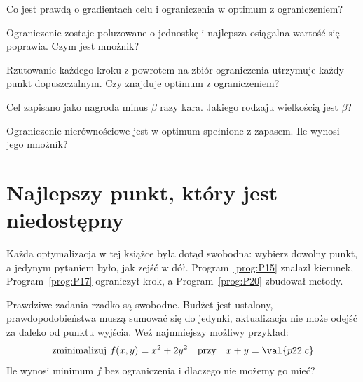 \begin{quiz}
\item Co jest prawdą o gradientach celu i ograniczenia w optimum z
  ograniczeniem? 
\item Ograniczenie zostaje poluzowane o jednostkę i najlepsza osiągalna
  wartość się poprawia. Czym jest mnożnik? 
\item Rzutowanie każdego kroku z powrotem na zbiór ograniczenia utrzymuje
  każdy punkt dopuszczalnym. Czy znajduje optimum z ograniczeniem?
\item Cel zapisano jako nagroda minus $\beta$ razy kara. Jakiego rodzaju
  wielkością jest $\beta$? 
\item Ograniczenie nierównościowe jest w optimum spełnione z zapasem. Ile
  wynosi jego mnożnik? 
\end{quiz}

\section{Najlepszy punkt, który jest niedostępny}
\label{sec:P22-constraint}

\begin{fr}
Każda optymalizacja w tej książce była dotąd swobodna: wybierz dowolny punkt, a
jedynym pytaniem było, jak zejść w dół. Program~\ref{prog:P15} znalazł kierunek,
Program~\ref{prog:P17} ograniczył krok, a Program~\ref{prog:P20} zbudował
metody.

Prawdziwe zadania rzadko są swobodne. Budżet jest ustalony, prawdopodobieństwa
muszą sumować się do jedynki, aktualizacja nie może odejść za daleko od punktu
wyjścia. Weź najmniejszy możliwy przykład:
\[ \text{zminimalizuj } f(x,y) = x^{2} + 2y^{2}
   \quad\text{przy}\quad x + y = \val{p22.c} \]
Ile wynosi minimum $f$ bez ograniczenia i dlaczego nie możemy go mieć?
\dotline
\nextframe
\end{fr}

